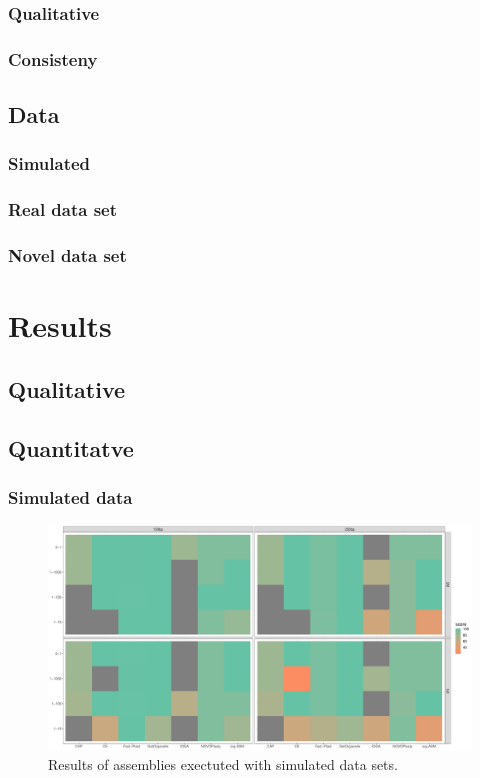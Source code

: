 \subsubsection{Qualitative}
\subsubsection{Consisteny}


\subsection{Data}
\subsubsection{Simulated}
\subsubsection{Real data set}
\subsubsection{Novel data set}


\section{Results}
\subsection{Qualitative}

\subsection{Quantitatve}
\subsubsection{Simulated data}
\begin{figure}[H]
\centering
\includegraphics[height=.45\textheight, width=.95\textwidth]{Figures/sim_tiles}
\decoRule
\caption[Score of assemblies of simulated data sets]{Results of assemblies exectuted with simulated data sets.}
\label{fig:sim_tiles}
\end{figure}



